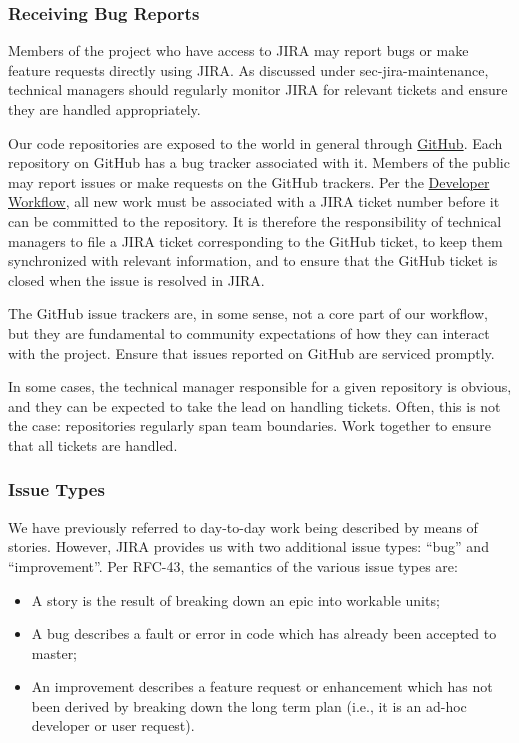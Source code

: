 \subsubsection{Receiving Bug Reports}\label{receiving-bug-reports}

Members of the project who have access to JIRA may report bugs or make
feature requests directly using JIRA. As discussed under
sec-jira-maintenance, technical managers should regularly monitor JIRA
for relevant tickets and ensure they are handled appropriately.

Our code repositories are exposed to the world in general through
\href{https://github.com/lsst/}{GitHub}. Each repository on GitHub has a
bug tracker associated with it. Members of the public may report issues
or make requests on the GitHub trackers. Per the
\href{https://developer.lsst.io/processes/workflow.html}{Developer
Workflow}, all new work must be associated with a JIRA ticket number
before it can be committed to the repository. It is therefore the
responsibility of technical managers to file a JIRA ticket corresponding
to the GitHub ticket, to keep them synchronized with relevant
information, and to ensure that the GitHub ticket is closed when the
issue is resolved in JIRA.

The GitHub issue trackers are, in some sense, not a core part of our
workflow, but they are fundamental to community expectations of how they
can interact with the project. Ensure that issues reported on GitHub are
serviced promptly.

In some cases, the technical manager responsible for a given repository
is obvious, and they can be expected to take the lead on handling
tickets. Often, this is not the case: repositories regularly span team
boundaries. Work together to ensure that all tickets are handled.

\subsubsection{Issue Types}\label{issue-types}

We have previously referred to day-to-day work being described by means
of stories. However, JIRA provides us with two additional issue types:
``bug'' and ``improvement''. Per RFC-43, the semantics of the various
issue types are:

\begin{itemize}
\item
  A story is the result of breaking down an epic into workable units;
\item
  A bug describes a fault or error in code which has already been
  accepted to master;
\item
  An improvement describes a feature request or enhancement which has
  not been derived by breaking down the long term plan (i.e., it is an
  ad-hoc developer or user request).
\end{itemize}

